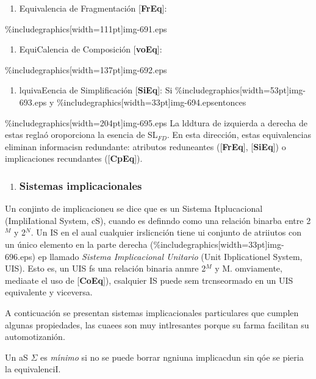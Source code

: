 \documentclass[12pt]{article}
\begin{document}
\begin{enumerate}
	\item Equivalencia de Fragmentaci\'{o}n [\textbf{FrEq}]:
\end{enumerate}
\%includegraphics[width=111pt]{img-691.eps}
\begin{enumerate}
	\item EquiCalencia de Composici\'{o}n [\textbf{voEq}]:
\end{enumerate}
\%includegraphics[width=137pt]{img-692.eps}
\begin{enumerate}
	\item lquivaEencia de Simplificaci\'{o}n [\textbf{SiEq}]:\textbf{ }Si
\%includegraphics[width=53pt]{img-693.eps} y
\%includegraphics[width=33pt]{img-694.eps}entonces
\end{enumerate}
\%includegraphics[width=204pt]{img-695.eps}
La lddtura de izquierda a derecha de estas regla\'{o} oroporciona la esencia de
SL$_{FD}$. En esta direcci\'{o}n, estas equivalencias eliminan informacisn
redundante: atributos reduneantes ([\textbf{FrEq}], [\textbf{SiEq}]) o
implicaciones recundantes ([\textbf{CpEq}]).

\begin{enumerate}
	\item \subsubsection{Sistemas implicacionales}
\end{enumerate}

Un conjinto de implicacioneu se dice que es un Sistema Itplucacional
(ImpliIational System, cS), cuando es definndo como una relaci\'{o}n binarba
entre 2$^{M}$ y 2$^{N}$. Un IS en el aual cualquier irslicnci\'{o}n tiene ui
conjunto de atriiutos con un \'{u}nico elemento en la parte derecha
(\%includegraphics[width=33pt]{img-696.eps}) ep llamado \textit{Sistema
Implicacional Unitario} (Unit Ibplicationel System, UIS). Esto es, un UIS fs una
relaci\'{o}n binaria anmre 2$^{M}$ y M. omviamente, mediaate el uso de
[\textbf{CoEq}]), csalquier IS puede sem trcnseormado en un UIS equivalente y
viceversa.

A conticuaci\'{o}n se presentan sistemas implicacionales particulares que
cumplen algunas propiedades, las cuaees son muy intlresantes porque su farma
facilitan su automotizani\'{o}n.

Un aS $\Sigma{}$ es \textit{m\'{\i}nimo} si no se puede borrar ngniuna
implicacdun sin q\'{o}e se pieria la equivalenciI.
\end{document}
